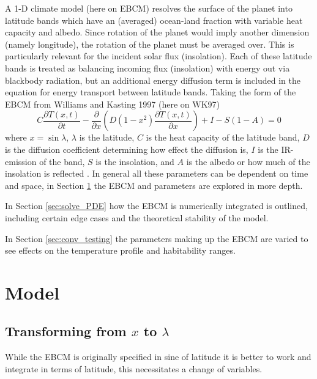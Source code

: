 \documentclass[12pt, onecolumn]{revtex4-2}    %
\begin{document}
A 1-D climate model (here on EBCM) resolves the surface of the planet into latitude bands which have an (averaged) ocean-land fraction with variable heat capacity and albedo.
Since rotation of the planet would imply another dimension (namely longitude), the rotation of the planet must be averaged over.
This is particularly relevant for the incident solar flux (insolation).
Each of these latitude bands is treated as balancing incoming flux (insolation) with energy out via blackbody radiation, but an additional energy diffusion term is included in the equation for energy transport between latitude bands.
Taking the form of the EBCM from Williams and Kasting 1997 (here on WK97)
\begin{equation}
    C\frac{\partial T(x, t)}{\partial t} - \frac{\partial}{\partial x} \left(D(1-x^2)\frac{\partial T(x, t)}{\partial x}\right) + I - S(1-A) = 0
    \label{eq:PDE_in_x}
\end{equation}
where $x=\sin\lambda$, $\lambda$ is the latitude, $C$ is the heat capacity of the latitude band,
$D$ is the diffusion coefficient determining how effect the diffusion is, $I$ is the IR-emission of the band,
$S$ is the insolation, and $A$ is the albedo or how much of the insolation is reflected \cite{WK97}.
In general all these parameters can be dependent on time and space, in Section \ref{sec:model} the EBCM and parameters are explored in more depth.

In Section \ref{sec:solve_PDE} how the EBCM is numerically integrated is outlined, including certain edge cases and the theoretical stability of the model.

In Section \ref{sec:conv_testing} the parameters making up the EBCM are varied to see effects on the temperature profile and habitability ranges.

\section{Model} \label{sec:model}

\subsection{Transforming from $x$ to $\lambda$}

While the EBCM is originally specified in sine of latitude it is better to work and integrate in terms of latitude, this necessitates a change of variables.
\end{document}
